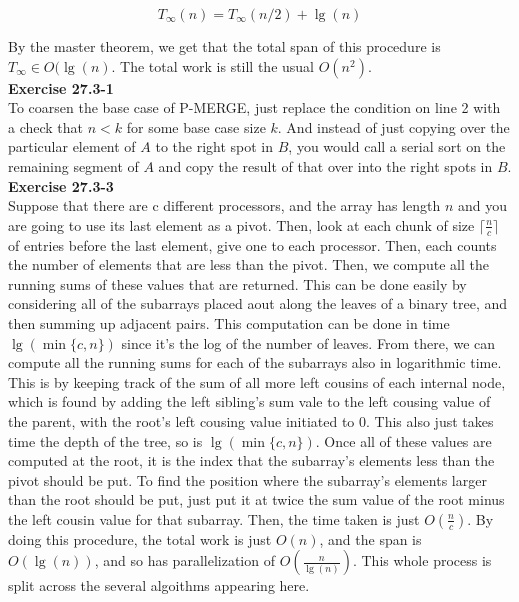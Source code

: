 \documentclass{article}
\begin{document}
\[
T_{\infty}(n) = T_{\infty}(n/2) + \lg(n)
\]

By the master theorem, we get that the total span of this procedure is $T_{\infty} \in O(\lg(n)$. The total work is still the usual $O(n^2)$.\\



\noindent\textbf{Exercise 27.3-1}\\
To coarsen the base case of P-MERGE, just replace the condition on line 2 with a check that $n<k$ for some base case size $k$. And instead of just copying over the particular element of $A$ to the right spot in $B$,  you would call a serial sort on the remaining segment of $A$ and copy the result of that over into the right spots in $B$.\\



\noindent\textbf{Exercise 27.3-3}\\
Suppose that there are c different processors, and the array has length $n$ and you are going to use its last element as a pivot. Then, look at each chunk of size $\lceil\frac{n}{c}\rceil$ of entries before the last element, give one to each processor. Then, each counts the number of elements that are less than the pivot. Then, we compute all the running sums of these values that are returned. This can be done easily by considering all of the subarrays placed aout along the leaves of a binary tree, and then summing up adjacent pairs. This computation can be done in time $\lg(\min\{c,n\})$ since it's the log of the number of leaves. From there, we can compute all the running sums for each of the subarrays also in logarithmic time. This is by keeping track of the sum of all more left cousins of each internal node, which is found by adding the left sibling's sum vale to the left cousing value of the parent, with the root's left cousing value initiated to 0. This also just takes time the depth of the tree, so is $\lg(\min\{c,n\})$. Once all of these values are computed at the root, it is the index that the subarray's elements less than the pivot should be put. To find the position where the subarray's elements larger than the root should be put, just put it at twice the sum value of the root minus the left cousin value for that subarray. Then, the time taken is just $O(\frac{n}{c})$. By doing this procedure, the total work is just $O(n)$, and the span is $O(\lg(n))$, and so has parallelization of $O(\frac{n}{\lg(n)})$. This whole process is split across the several algoithms appearing here.
\end{document}
